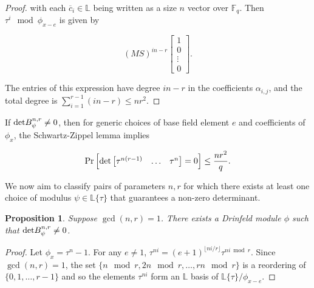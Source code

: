 \documentclass[sigconf]{acmart}
\newtheorem{prop}{Proposition}
\renewcommand{\L}{\mathbb{L}}
\newcommand{\sring}{\L\{\tau\}}
\begin{document}
\begin{proof}
with each $\overline{c}_i \in \L$ being written as a size $n$ vector over $\mathbb{F}_q$. Then $\tau^{i} \mod \phi_{x-e}$ is given by 

\begin{equation*}
(MS)^{in-r} \begin{bmatrix} 1 \\ 0 \\ \vdots \\ 0 \end{bmatrix}.
\end{equation*}

The entries of this expression have degree $in - r$ in the coefficients $\alpha_{i,j}$, and the total degree is $\sum_{i=1}^{r-1} (in - r) \leq nr^2$.

\end{proof}

If $\textnormal{det} B_{\psi}^{n,r} \neq 0 $, then for generic choices of base field element $e$ and coefficients of $\phi_x$, the Schwartz-Zippel lemma implies


\begin{equation*}
    \Pr\Big[\textnormal{det} \begin{bmatrix} \tau^{n(r-1)} & \ldots & \tau^{n} \end{bmatrix} = 0\Big] \leq \frac{nr^2}{q}.
\end{equation*}

We now aim to classify pairs of parameters $n,r$ for which there exists at least one choice of modulus $\psi \in \sring$ that guarantees a non-zero determinant. 

\begin{prop}
Suppose $\gcd(n,r) = 1$. There exists a Drinfeld module $\phi$ such that $\textnormal{det} B_{\psi}^{n,r} \neq 0$.  %
\end{prop}
\begin{proof}
Let $\phi_x = \tau^n - 1$. For any $e \neq 1$, $\tau^{ni} = (e + 1)^{\lfloor ni/r \rfloor} \tau^{ni \bmod r}$. Since $\gcd(n,r) = 1$, the set $\{ n \mod r, 2n \mod r, \ldots, rn \mod r\}$ is a reordering of $\{0, 1, \ldots, r-1\}$ and so the elements $\tau^{ni}$ form an $\L$ basis of $\L\{ \tau\}/\phi_{x - e}$.
\end{proof}
\end{document}
